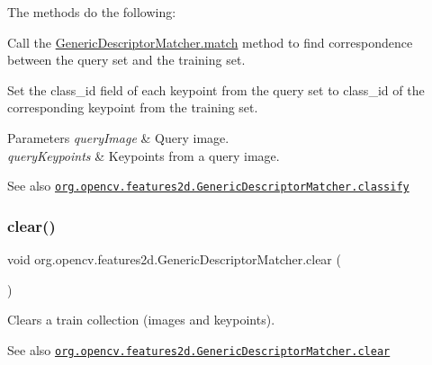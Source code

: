 The methods do the following\+:


\begin{DoxyItemize}
\item Call the {\ttfamily \mbox{\hyperlink{classorg_1_1opencv_1_1features2d_1_1_generic_descriptor_matcher_ab02d6f8f1fa4c188b431bc6fcc5a4cac}{Generic\+Descriptor\+Matcher.\+match}}} method to find correspondence between the query set and the training set. 
\item Set the {\ttfamily class\+\_\+id} field of each keypoint from the query set to {\ttfamily class\+\_\+id} of the corresponding keypoint from the training set. 
\end{DoxyItemize}


\begin{DoxyParams}{Parameters}
{\em query\+Image} & Query image. \\
\hline
{\em query\+Keypoints} & Keypoints from a query image.\\
\hline
\end{DoxyParams}
\begin{DoxySeeAlso}{See also}
\href{http://docs.opencv.org/modules/features2d/doc/common_interfaces_of_generic_descriptor_matchers.html#genericdescriptormatcher-classify}{\tt org.\+opencv.\+features2d.\+Generic\+Descriptor\+Matcher.\+classify} 
\end{DoxySeeAlso}
\mbox{\label{classorg_1_1opencv_1_1features2d_1_1_generic_descriptor_matcher_aa5902c8aca6b21e07f0ea6709b632530}} 
\subsubsection{\texorpdfstring{clear()}{clear()}}
{\footnotesize\ttfamily void org.\+opencv.\+features2d.\+Generic\+Descriptor\+Matcher.\+clear (\begin{DoxyParamCaption}{ }\end{DoxyParamCaption})}

Clears a train collection (images and keypoints).

\begin{DoxySeeAlso}{See also}
\href{http://docs.opencv.org/modules/features2d/doc/common_interfaces_of_generic_descriptor_matchers.html#genericdescriptormatcher-clear}{\tt org.\+opencv.\+features2d.\+Generic\+Descriptor\+Matcher.\+clear} 
\end{DoxySeeAlso}
\mbox{\label{classorg_1_1opencv_1_1features2d_1_1_generic_descriptor_matcher_aacf1be1b878d2532bd04685e46a6d25e}} 
